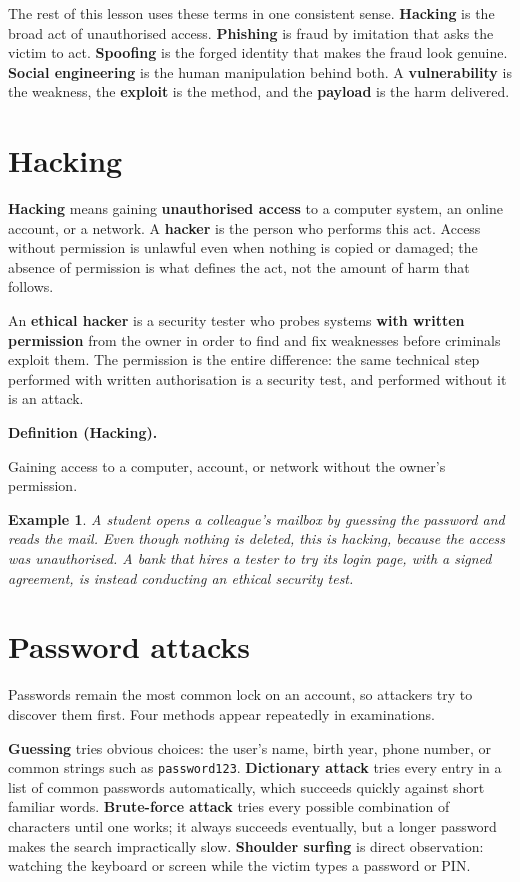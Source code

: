 \documentclass[11pt]{article}
\newtheorem{example}{Example}[section]
\newenvironment{definitionbox}[1]{%
  \par\noindent\textbf{Definition (#1).}\ \itshape
}{\par\vspace{0.3em}}
\begin{document}
The rest of this lesson uses these terms in one consistent sense.
\textbf{Hacking} is the broad act of unauthorised access.
\textbf{Phishing} is fraud by imitation that asks the victim to act.
\textbf{Spoofing} is the forged identity that makes the fraud look
genuine. \textbf{Social engineering} is the human manipulation behind
both. A \textbf{vulnerability} is the weakness, the \textbf{exploit} is
the method, and the \textbf{payload} is the harm delivered.

\section{Hacking}
\textbf{Hacking} means gaining \textbf{unauthorised access} to a
computer system, an online account, or a network. A \textbf{hacker} is
the person who performs this act. Access without permission is unlawful
even when nothing is copied or damaged; the absence of permission is
what defines the act, not the amount of harm that follows.

An \textbf{ethical hacker} is a security tester who probes systems
\textbf{with written permission} from the owner in order to find and fix
weaknesses before criminals exploit them. The permission is the entire
difference: the same technical step performed with written authorisation
is a security test, and performed without it is an attack.

\begin{definitionbox}{Hacking}
Gaining access to a computer, account, or network without the owner's
permission.
\end{definitionbox}

\begin{example}
A student opens a colleague's mailbox by guessing the password and
reads the mail. Even though nothing is deleted, this is hacking,
because the access was unauthorised. A bank that hires a tester to try
its login page, with a signed agreement, is instead conducting an
ethical security test.
\end{example}

\section{Password attacks}
Passwords remain the most common lock on an account, so attackers try
to discover them first. Four methods appear repeatedly in examinations.

\textbf{Guessing} tries obvious choices: the user's name, birth year,
phone number, or common strings such as \texttt{password123}.
\textbf{Dictionary attack} tries every entry in a list of common
passwords automatically, which succeeds quickly against short familiar
words. \textbf{Brute-force attack} tries every possible combination of
characters until one works; it always succeeds eventually, but a longer
password makes the search impractically slow. \textbf{Shoulder surfing}
is direct observation: watching the keyboard or screen while the victim
types a password or PIN.
\end{document}
